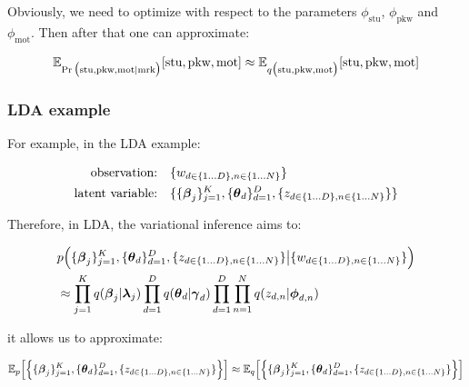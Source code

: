 \documentclass{article}
\begin{document}
Obviously, we need to optimize with respect to the parameters $\phi_\text{stu}$, $\phi_\text{pkw}$ and $\phi_\text{mot}$. Then after that one can approximate:

\begin{equation}\begin{split}
\mathbb{E}_{ \Pr \big(\text{stu},\text{pkw},\text{mot} | \text{mrk} \big)} [ \text{stu},\text{pkw},\text{mot}  ]
\approx \mathbb{E}_{ q \big(\text{stu},\text{pkw},\text{mot} \big)} [ \text{stu},\text{pkw},\text{mot}  ]
\end{split}\end{equation}



\subsubsection{LDA example \optional}


For example, in the LDA example:

\begin{equation}\begin{split}
\text{observation:}\quad &\{ w_{d \in \{1 \dots D \}, n \in \{1 \dots N \}  } \}  \\
\text{latent variable:}\quad &\{ \{ \boldsymbol{\beta}_j \}_{j=1}^K ,  \{\boldsymbol{\theta}_d\}_{d=1}^D,  \{ z_{d \in \{1 \dots D \}, n \in \{1 \dots N \} } \} \}
\end{split}\end{equation}

Therefore, in LDA, the variational inference aims to:

\begin{equation}\begin{split}
&p \Big(  \{ \boldsymbol{\beta}_j \}_{j=1}^K ,  \{\boldsymbol{\theta}_d\}_{d=1}^D,  \{ z_{d \in \{1 \dots D \}, n \in \{1 \dots N \} } \} \big|  
\{ w_{d \in \{1 \dots D \}, n \in \{1 \dots N \} } \} \Big)\\
&\approx \prod_{j=1}^K q(\boldsymbol{\beta}_j | \boldsymbol{\lambda}_j) \prod_{d=1}^D q(\boldsymbol{\theta}_d | \boldsymbol{\gamma}_d) \prod_{d=1}^D \prod_{n=1}^N q(z_{d,n} | \boldsymbol{\phi}_{d,n})
\end{split}\end{equation}

it allows us to approximate:

\begin{equation}\begin{split}
\mathbb{E}_p \Big[ \Big\{ \{ \boldsymbol{\beta}_j \}_{j=1}^K ,  \{\boldsymbol{\theta}_d\}_{d=1}^D,  \{ z_{d \in \{1 \dots D \}, n \in \{1 \dots N \} } \}\Big\} \Big]
\approx
\mathbb{E}_q \Big[ \Big\{ \{ \boldsymbol{\beta}_j \}_{j=1}^K ,  \{\boldsymbol{\theta}_d\}_{d=1}^D,  \{ z_{d \in \{1 \dots D \}, n \in \{1 \dots N \} } \}\Big\} \Big]
\end{split}\end{equation}
\end{document}

